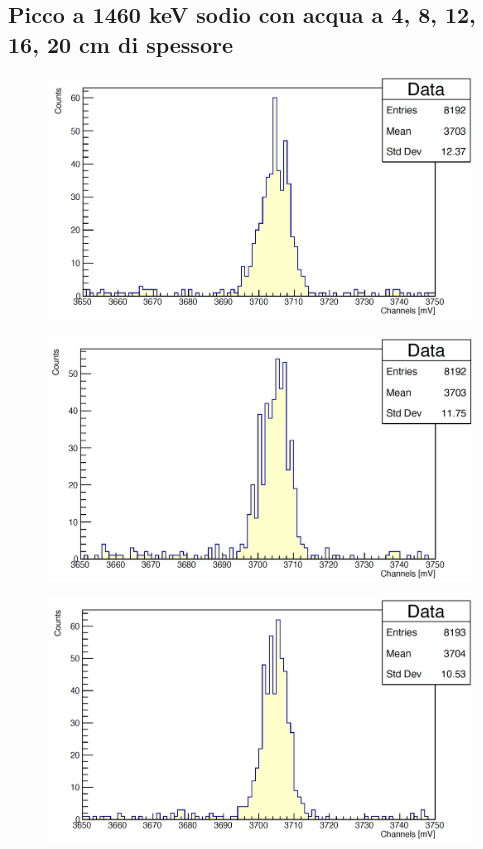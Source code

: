 \documentclass[a4paper,10pt]{article}
\begin{document}
\subsection{Picco a 1460 keV sodio con acqua a 4, 8, 12, 16, 20 cm di spessore}
\begin{figure}[H]
    \centering
    \includegraphics[scale=0.45]{appendice/spettri/NaA_1460_4}
\end{figure}
\begin{figure}[H]
    \centering
    \includegraphics[scale=0.45]{appendice/spettri/NaA_1460_8}
\end{figure}
\begin{figure}[H]
    \centering
    \includegraphics[scale=0.45]{appendice/spettri/NaA_1460_12}
\end{figure}
\end{document}
